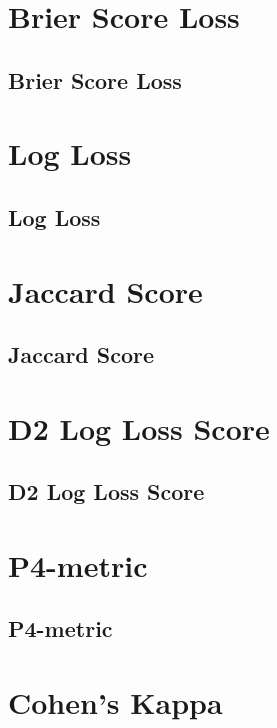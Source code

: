 \clearpage
\thispagestyle{classificationstyle}
\section{Brier Score Loss}
\subsection{Brier Score Loss}

\clearpage
\thispagestyle{classificationstyle}
\section{Log Loss}
\subsection{Log Loss}

\clearpage
\thispagestyle{classificationstyle}
\section{Jaccard Score}
\subsection{Jaccard Score}

\clearpage
\thispagestyle{classificationstyle}
\section{D2 Log Loss Score}
\subsection{D2 Log Loss Score}

\clearpage
\thispagestyle{classificationstyle}
\section{P4-metric}
\subsection{P4-metric}

\clearpage
\thispagestyle{classificationstyle}
\section{Cohen's Kappa}
